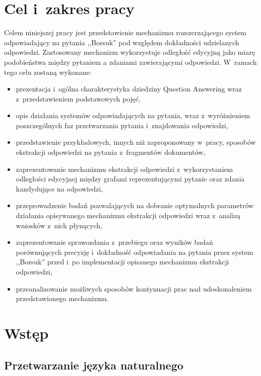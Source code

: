 \documentclass[a4paper, twoside, openright, 12pt]{report}
\begin{document}
\chapter{Cel i~zakres pracy}
    Celem niniejszej pracy jest przedstawienie mechanizmu rozszerzającego system odpowiadający na pytania ,,Borsuk''
    pod względem dokładności udzielanych odpowiedzi. Zastosowany mechanizm wykorzystuje odległość edycyjną jako miarę
    podobieństwa między pytaniem a zdaniami zawierającymi odpowiedzi. W~ramach tego celu zostaną wykonane:
    \begin{itemize}
        \item prezentacja i~ogólna charakterystyka dziedziny Question Answering wraz z~przedstawieniem podstawowych
            pojęć,
        \item opis działania systemów odpowiadających na pytania, wraz z~wyróżnieniem poszczególnych faz przetwarzania
            pytania i~znajdowania odpowiedzi,
        \item przedstawienie przykładowych, innych niż zaproponowany w~pracy,
            sposobów ekstrakcji odpowiedzi na pytania z~fragmentów dokumentów,
        \item zaprezentowanie mechanizmu ekstrakcji odpowiedzi z~wykorzystaniem odległości edycyjnej między grafami
            reprezentującymi pytanie oraz zdania kandydujące na odpowiedzi,
        \item przeprowadzenie badań pozwalających na dobranie optymalnych parametrów działania opisywanego
            mechanizmu ekstrakcji odpowiedzi wraz z~analizą wniosków z~nich płynących,
       \item zaprezentowanie sprawozdania z~przebiegu oraz wyników badań porównujących precyzję i~dokładność
           odpowiadania na pytania przez system ,,Borsuk'' przed i~po implementacji opisanego mechanizmu ekstrakcji
           odpowiedzi,
       \item przeanalizowanie możliwych sposobów kontynuacji prac nad udoskonaleniem przedstawionego mechanizmu.

    \end{itemize}

\chapter{Wstęp}
    \section{Przetwarzanie języka naturalnego}
\end{document}
